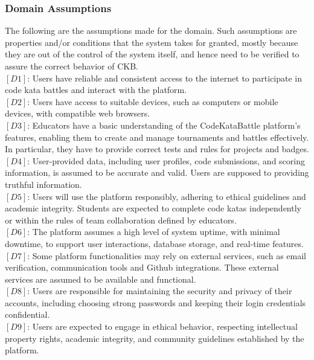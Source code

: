 \subsubsection{Domain Assumptions}
The following are the assumptions made for the domain. Such assumptions are properties and/or conditions that the system takes for granted, mostly because they are out of the control of the system itself, and hence need to be verified to assure the correct behavior of CKB.
\\$[D1]$: Users have reliable and consistent access to the internet to participate in code kata battles and interact with the platform.
\\$[D2]$: Users have access to suitable devices, such as computers or mobile devices, with compatible web browsers.
\\$[D3]$: Educators have a basic understanding of the CodeKataBattle platform's features, enabling them to create and manage tournaments and battles effectively. In particular, they have to provide correct tests and rules for projects and badges.
\\$[D4]$: User-provided data, including user profiles, code submissions, and scoring information, is assumed to be accurate and valid. Users are supposed to providing truthful information.
\\$[D5]$: Users will use the platform responsibly, adhering to ethical guidelines and academic integrity. Students are expected to complete code katas independently or within the rules of team collaboration defined by educators.
\\$[D6]$: The platform assumes a high level of system uptime, with minimal downtime, to support user interactions, database storage, and real-time features.
\\$[D7]$: Some platform functionalities may rely on external services, such as email verification, communication tools and Github integrations. These external services are assumed to be available and functional.
\\$[D8]$: Users are responsible for maintaining the security and privacy of their accounts, including choosing strong passwords and keeping their login credentials confidential.
\\$[D9]$: Users are expected to engage in ethical behavior, respecting intellectual property rights, academic integrity, and community guidelines established by the platform.
